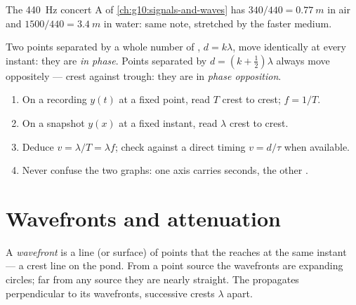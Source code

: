 \begin{example}\label{ex:g12:mechanical-waves:concertA}
The \qty{440}{Hz} concert A of \cref{ch:g10:signals-and-waves} has
 $340/440 = \qty{0.77}{m}$ in air and $1500/440 =
\qty{3.4}{m}$ in water: same note, stretched by the faster medium.
\end{example}

\begin{definition}\label{def:g12:mechanical-waves:phase}
Two points separated by a whole number of , $d = k\lambda$,
move identically at every instant: they are
\emph{in phase}. Points separated by
$d = (k + \tfrac12)\lambda$ always move oppositely --- crest against
trough: they are in \emph{phase opposition}.
\end{definition}

\begin{method}\label{met:g12:mechanical-waves:reading}
\begin{enumerate}
  \item On a recording $y(t)$ at a fixed point, read $T$ crest to
        crest; $f = 1/T$.
  \item On a snapshot $y(x)$ at a fixed instant, read $\lambda$ crest
        to crest.
  \item Deduce $v = \lambda/T = \lambda f$; check against a direct
        timing $v = d/\tau$ when available.
  \item Never confuse the two graphs: one axis carries seconds, the
        other .
\end{enumerate}
\end{method}

\section{Wavefronts and attenuation}

\begin{definition}[Wavefront]\label{def:g12:mechanical-waves:wavefront}
A \emph{wavefront} is a line (or surface) of points
that the  reaches at the same instant --- a crest line on the
pond. From a point source the wavefronts are expanding circles; far
from any source they are nearly straight. The  propagates
perpendicular to its wavefronts, successive crests $\lambda$ apart.
\end{definition}

